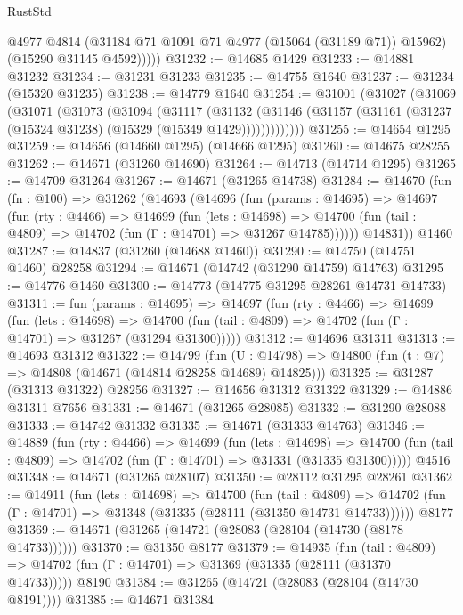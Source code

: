 \begin{lexlean}{RustStd}
\begin{coremodule}
            @4977
            @4814
            (@31184 @71 @1091 @71 @4977 (@15064 (@31189 @71)) @15962)
            (@15290 @31145 @4592)))))
@31232 := @14685 @1429
@31233 := @14881 @31232
@31234 := @31231 @31233
@31235 := @14755 @1640
@31237 := @31234 (@15320 @31235)
@31238 := @14779 @1640
@31254 := @31001
    (@31027
      (@31069
        (@31071
          (@31073
            (@31094
              (@31117
                (@31132
                  (@31146 (@31157 (@31161 (@31237 (@15324 @31238) (@15329 (@15349 @1429)))))))))))))
@31255 := @14654 @1295
@31259 := @14656 (@14660 @1295) (@14666 @1295)
@31260 := @14675 @28255
@31262 := @14671 (@31260 @14690)
@31264 := @14713 (@14714 @1295)
@31265 := @14709 @31264
@31267 := @14671 (@31265 @14738)
@31284 := @14670
    (fun (fn : @100) =>
    @31262
      (@14693
        (@14696
          (fun (params : @14695) =>
          @14697
            (fun (rty : @4466) =>
            @14699
              (fun (lets : @14698) =>
              @14700 (fun (tail : @4809) => @14702 (fun (Γ : @14701) => @31267 @14785))))))
        @14831))
    @1460
@31287 := @14837 (@31260 (@14688 @1460))
@31290 := @14750 (@14751 @1460) @28258
@31294 := @14671 (@14742 (@31290 @14759) @14763)
@31295 := @14776 @1460
@31300 := @14773 (@14775 @31295 @28261 @14731 @14733)
@31311 := fun (params : @14695) =>
  @14697
    (fun (rty : @4466) =>
    @14699
      (fun (lets : @14698) =>
      @14700 (fun (tail : @4809) => @14702 (fun (Γ : @14701) => @31267 (@31294 @31300)))))
@31312 := @14696 @31311
@31313 := @14693 @31312
@31322 := @14799
    (fun (U : @14798) => @14800 (fun (t : @7) => @14808 (@14671 (@14814 @28258 @14689) @14825)))
@31325 := @31287 (@31313 @31322) @28256
@31327 := @14656 @31312 @31322
@31329 := @14886 @31311 @7656
@31331 := @14671 (@31265 @28085)
@31332 := @31290 @28088
@31333 := @14742 @31332
@31335 := @14671 (@31333 @14763)
@31346 := @14889
    (fun (rty : @4466) =>
    @14699
      (fun (lets : @14698) =>
      @14700 (fun (tail : @4809) => @14702 (fun (Γ : @14701) => @31331 (@31335 @31300)))))
    @4516
@31348 := @14671 (@31265 @28107)
@31350 := @28112 @31295 @28261
@31362 := @14911
    (fun (lets : @14698) =>
    @14700
      (fun (tail : @4809) =>
      @14702 (fun (Γ : @14701) => @31348 (@31335 (@28111 (@31350 @14731 @14733))))))
    @8177
@31369 := @14671 (@31265 (@14721 (@28083 (@28104 (@14730 (@8178 @14733))))))
@31370 := @31350 @8177
@31379 := @14935
    (fun (tail : @4809) => @14702 (fun (Γ : @14701) => @31369 (@31335 (@28111 (@31370 @14733)))))
    @8190
@31384 := @31265 (@14721 (@28083 (@28104 (@14730 @8191))))
@31385 := @14671 @31384

\end{coremodule}
\end{lexlean}
